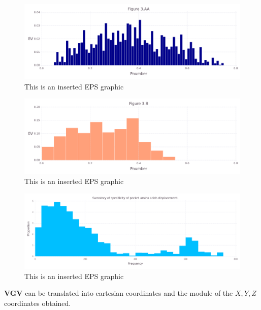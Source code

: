 \documentclass[10pt,letterpaper]{article}
\begin{document}
\begin{figure}[ht]
\begin{center}
\includegraphics[scale=0.5]{1xkk/3aafigure.pdf}
\caption{This is an inserted EPS graphic}
\label{fig8}
\end{center}
\end{figure}

\begin{figure}[ht]
\begin{center}
\includegraphics[scale=0.5]{1xkk/3bfigure.pdf}
\caption{This is an inserted EPS graphic}
\label{fig10}
\end{center}
\end{figure}

\begin{figure}[ht]
\begin{center}
\includegraphics[scale=0.5]{1xkk/3bbfigure.pdf}
\caption{This is an inserted EPS graphic}
\label{fig11}
\end{center}
\end{figure}

\FloatBarrier


\textbf{VGV} can be translated into cartesian coordinates and the module of the \(X, Y, Z\) coordinates obtained.
\end{document}
